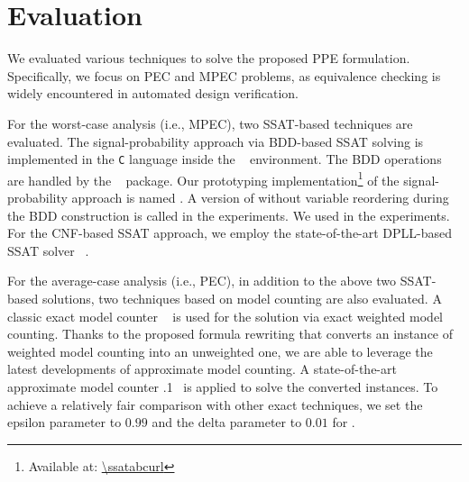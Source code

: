 
\section{Evaluation}
\label{sect:prob-evaluation}

We evaluated various techniques to solve the proposed PPE formulation.
Specifically, we focus on PEC and MPEC problems,
as equivalence checking is widely encountered in automated design verification.

For the worst-case analysis (i.e., MPEC), two SSAT-based techniques are evaluated.
The signal-probability approach via BDD-based SSAT solving
is implemented in the \texttt{C} language inside the \abc~\cite{ABC} environment.
The BDD operations are handled by the \cudd~\cite{CUDD} package.
Our prototyping implementation\footnote{Available at: \url{\ssatabcurl}}
of the signal-probability approach is named \bddsp.
A version of \bddsp without variable reordering during the BDD construction
is called \bddspnr in the experiments.
We used \ssatABCRevision in the experiments.
For the CNF-based SSAT approach,
we employ the state-of-the-art DPLL-based SSAT solver \dcssat~\cite{Majercik2005}.

For the average-case analysis (i.e., PEC),
in addition to the above two SSAT-based solutions,
two techniques based on model counting are also evaluated.
A classic exact model counter \cachet~\cite{Sang2004,Sang2005ModelCounting} is used
for the solution via exact weighted model counting.
Thanks to the proposed formula rewriting
that converts an instance of weighted model counting into an unweighted one,
we are able to leverage the latest developments of approximate model counting.
A state-of-the-art approximate model counter .1~\cite{Chakraborty2013,Chakraborty2016}
is applied to solve the converted instances.
To achieve a relatively fair comparison with other exact techniques,
we set the epsilon parameter to $0.99$ and the delta parameter to $0.01$ for \approxmc.

